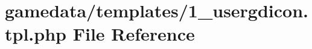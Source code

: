 \hypertarget{1__usergdicon_8tpl_8php}{\section{gamedata/templates/1\+\_\+usergdicon.tpl.\+php File Reference}
\label{1__usergdicon_8tpl_8php}
}
